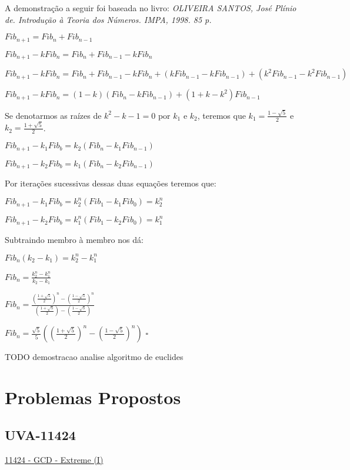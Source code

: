 A demonstração a seguir foi baseada no livro: \textit{OLIVEIRA SANTOS, José Plínio de. Introdução à Teoria dos Números. IMPA, 1998. 85 p.}

$Fib_{n+1} = Fib_n + Fib_{n-1}$

$Fib_{n+1} - kFib_n = Fib_n + Fib_{n-1} - kFib_n$

$Fib_{n+1} - kFib_n = Fib_n + Fib_{n-1} - kFib_n + (kFib_{n-1}-kFib_{n-1}) + (k^2Fib_{n-1}-k^2Fib_{n-1})$

$Fib_{n+1} - kFib_n = (1 - k)(Fib_n - kFib_{n-1}) + (1 + k - k^2)Fib_{n-1}$

Se denotarmos as raízes de $k^2-k-1=0$ por $k_1$ e $k_2$, teremos que $k_1=\frac{1-\sqrt{5}}{2}$ e $k_2=\frac{1+\sqrt{5}}{2}$. 

$Fib_{n+1} - k_1Fib_b = k_2(Fib_n - k_1Fib_{n-1})$

$Fib_{n+1} - k_2Fib_b = k_1(Fib_n - k_2Fib_{n-1})$

Por iterações sucessivas dessas duas equações teremos que:

$Fib_{n+1} - k_1Fib_b = k_2^n(Fib_1 - k_1Fib_0) = k_2^n$

$Fib_{n+1} - k_2Fib_b = k_1^n(Fib_1 - k_2Fib_0) = k_1^n$

Subtraindo membro à membro nos dá:

$Fib_n(k_2 - k_1) = k_2^n - k_1^n$

$Fib_n = \frac{k_2^n - k_1^n}{k_2 - k_1}$

$Fib_n = \frac{(\frac{1+\sqrt{5}}{2})^n - (\frac{1-\sqrt{5}}{2})^n}{(\frac{1+\sqrt{5}}{2}) - (\frac{1-\sqrt{5}}{2})}$

$Fib_n = \frac{\sqrt{5}}{5}((\frac{1+\sqrt{5}}{2})^n - (\frac{1-\sqrt{5}}{2})^n)$ $\square$




TODO demostracao analise algoritmo de euclides


\section{Problemas Propostos}


\subsection{UVA-11424}
\href{https://uva.onlinejudge.org/index.php?option=onlinejudge&page=show_problem&problem=2419}{11424 - GCD - Extreme (I)} \\

